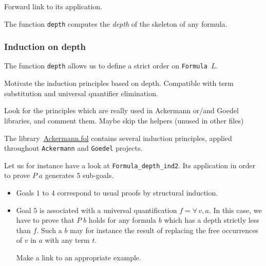 \begin{todo}
Forward link to its application.
\end{todo}


The function \texttt{depth} computes the \emph{depth} of the 
 skeleton of any formula.


\subsubsection{Induction on depth}

The function \texttt{depth} allows us to define a strict order on 
\texttt{Formula $L$}.



\begin{todo}
Motivate the induction principles based on depth. Compatible with term substitution and universal quantifier elimination.
\end{todo}




\begin{todo}
 Look for the principles which are really used in Ackermann or/and Goedel libraries, and comment them.
 Maybe skip the helpers (unused in other files)
\end{todo}

The library~\href{../theories/html/hydras.Ackermann.fol.html}{Ackermann.fol} contains several induction principles, applied 
throughout \texttt{Ackermann} and \texttt{Goedel} projects.


Let us for instance have a look  at \texttt{Formula\_depth\_ind2}. Its application in order to prove $P\;a$ generates 5 sub-goals. 


\begin{itemize}
\item Goals $1$ to $4$ correspond to  usual proofs by structural induction.
\item Goal $5$ is associated with a universal quantification $f=\forall\,v,a$. In this case, we have to prove that $P\;b$ holds for any formula $b$ which has a depth strictly less than $f$. Such a $b$ may for instance the result of replacing the free occurrences of $v$ in $a$ with any term $t$.
  \begin{todo}
   Make a link to an appropriate example.
  \end{todo}
\end{itemize}



